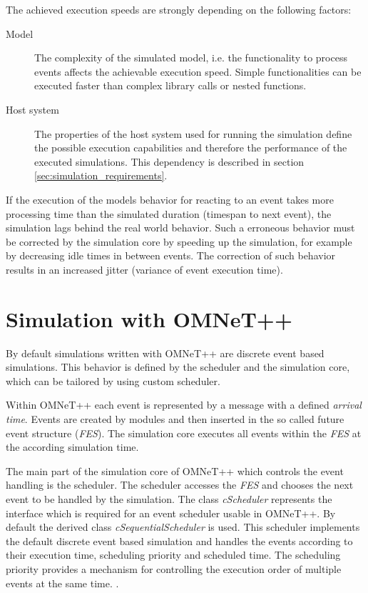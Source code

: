 The achieved execution speeds are strongly depending on the following factors:
\begin{description}
    \item[Model] The complexity of the simulated model, i.e. the functionality to process events affects the achievable execution speed.
                 Simple functionalities can be executed faster than complex library calls or nested functions.
    \item[Host system] The properties of the host system used for running the simulation define the possible execution capabilities and therefore the performance of the executed simulations.
                       This dependency is described in section \ref{sec:simulation_requirements}.
\end{description}

If the execution of the models behavior for reacting to an event takes more processing time than the simulated duration (timespan to next event), the simulation lags behind the real world behavior.
Such a erroneous behavior must be corrected by the simulation core by speeding up the simulation, for example by decreasing idle times in between events.
The correction of such behavior results in an increased jitter (variance of event execution time).
 \cite[section III.B]{belanger_what_2010}


\section{Simulation with OMNeT++}
\label{sec:simulation_omnet}
By default simulations written with OMNeT++ are discrete event based simulations.
This behavior is defined by the scheduler and the simulation core, which can be tailored by using custom scheduler. \cite[section 4.1]{omnet_manual}

Within OMNeT++ each event is represented by a message with a defined \emph{arrival time}.
Events are created by modules and then inserted in the so called future event structure (\emph{FES}).
The simulation core executes all events within the \emph{FES} at the according simulation time.

The main part of the simulation core of OMNeT++ which controls the event handling is the scheduler.
The scheduler accesses the \emph{FES} and chooses the next event to be handled by the simulation.
The class \emph{cScheduler} represents the interface which is required for an event scheduler usable in OMNeT++.
By default the derived class \emph{cSequentialScheduler} is used.
This scheduler implements the default discrete event based simulation and handles the events according to their execution time, scheduling priority and scheduled time.
The scheduling priority provides a mechanism for controlling the execution order of multiple events at the same time. \cite[section 4.1]{omnet_manual}.

